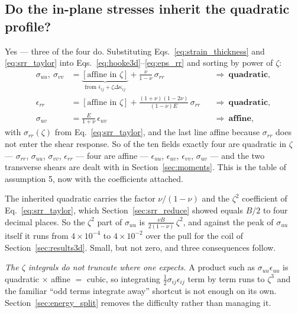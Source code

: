 \documentclass[11pt]{article}
\begin{document}
\subsection{Do the in-plane stresses inherit the quadratic profile?}
\label{sec:inherit}
Yes --- three of the four do. Substituting Eqs.~\eqref{eq:strain_thickness} and
\eqref{eq:srr_taylor} into Eqs.~\eqref{eq:hooke3d}--\eqref{eq:eps_rr} and sorting
by power of $\zeta$:
\begin{equation}\label{eq:inherit_table}
    \begin{aligned}
    \sigma_{uu},\ \sigma_{vv}
      &= \underbrace{\left[\text{affine in }\zeta\right]}
          _{\text{from }\bar\epsilon_{ij}+\zeta\Delta\kappa_{ij}}
        + \frac{\nu}{1-\nu}\,\sigma_{rr}
      &&\Longrightarrow\ \textbf{quadratic},\\
    \epsilon_{rr}
      &= \left[\text{affine in }\zeta\right]
        + \frac{\left(1+\nu\right)\left(1-2\nu\right)}
          {\left(1-\nu\right)E}\,\sigma_{rr}
      &&\Longrightarrow\ \textbf{quadratic},\\
    \sigma_{uv} &= \frac{E}{1+\nu}\,\epsilon_{uv}
      &&\Longrightarrow\ \textbf{affine},
    \end{aligned}
\end{equation}
with $\sigma_{rr}\left(\zeta\right)$ from Eq.~\eqref{eq:srr_taylor}, and the last
line affine because $\sigma_{rr}$ does not enter the shear response. So of the
ten fields exactly four are quadratic in $\zeta$ --- $\sigma_{rr}$,
$\sigma_{uu}$, $\sigma_{vv}$, $\epsilon_{rr}$ --- four are affine ---
$\epsilon_{uu}$, $\epsilon_{uv}$, $\epsilon_{vv}$, $\sigma_{uv}$ --- and the two
transverse shears are dealt with in Section~\ref{sec:moments}. This is the table
of assumption 5, now with the coefficients attached.

The inherited quadratic carries the factor $\nu/\left(1-\nu\right)$ and the
$\zeta^{2}$ coefficient of Eq.~\eqref{eq:srr_taylor}, which
Section~\ref{sec:srr_reduce} showed equals $B/2$ to four decimal places. So the
$\zeta^{2}$ part of $\sigma_{uu}$ is
$\frac{\nu B}{2\left(1-\nu\right)}\,\zeta^{2}$, and against the peak of
$\sigma_{uu}$ itself it runs from $4\times10^{-4}$ to $4\times10^{-2}$ over the
pull for the coil of Section~\ref{sec:results3d}. Small, but not zero, and three
consequences follow.

\emph{The $\zeta$ integrals do not truncate where one expects.} A product such as
$\sigma_{uu}\epsilon_{uu}$ is quadratic $\times$ affine $=$ cubic, so integrating
$\tfrac12\sigma_{ij}\epsilon_{ij}$ term by term runs to $\zeta^{3}$ and the
familiar ``odd terms integrate away'' shortcut is not enough on its own.
Section~\ref{sec:energy_split} removes the difficulty rather than managing it.
\end{document}
